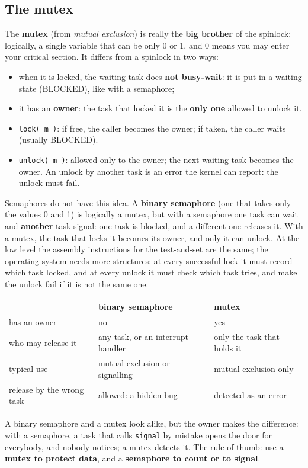 \subsection{The mutex}
The \textbf{mutex} (from \emph{mutual exclusion}) is really the \textbf{big brother} of the spinlock: logically, a single variable that can be only 0 or 1, and 0 means you may enter your critical section. It differs from a spinlock in two ways:
\begin{itemize}
    \item when it is locked, the waiting task does \textbf{not busy-wait}: it is put in a waiting state (BLOCKED), like with a semaphore;
    \item it has an \textbf{owner}: the task that locked it is the \textbf{only one} allowed to unlock it.
\end{itemize}
\begin{itemize}
    \item \texttt{lock( m )}: if free, the caller becomes the owner; if taken, the caller waits (usually BLOCKED).
    \item \texttt{unlock( m )}: allowed only to the owner; the next waiting task becomes the owner. An unlock by another task is an error the kernel can report: the unlock must fail.
\end{itemize}
Semaphores do not have this idea. A \textbf{binary semaphore} (one that takes only the values 0 and 1) is logically a mutex, but with a semaphore one task can wait and \textbf{another} task signal: one task is blocked, and a different one releases it. With a mutex, the task that locks it becomes its owner, and only it can unlock. At the low level the assembly instructions for the test-and-set are the same; the operating system needs more structures: at every successful lock it must record which task locked, and at every unlock it must check which task tries, and make the unlock fail if it is not the same one.
\begin{center}
\begin{tabular}{P{0.25} P{0.33} P{0.33}}
    \hline
    & \textbf{binary semaphore} & \textbf{mutex} \\
    \hline
    has an owner & no & yes \\
    who may release it & any task, or an interrupt handler & only the task that holds it \\
    typical use & mutual exclusion or signalling & mutual exclusion only \\
    release by the wrong task & allowed: a hidden bug & detected as an error \\
    \hline
\end{tabular}
\end{center}
A binary semaphore and a mutex look alike, but the owner makes the difference: with a semaphore, a task that calls \texttt{signal} by mistake opens the door for everybody, and nobody notices; a mutex detects it. The rule of thumb: use a \textbf{mutex to protect data}, and a \textbf{semaphore to count or to signal}.

